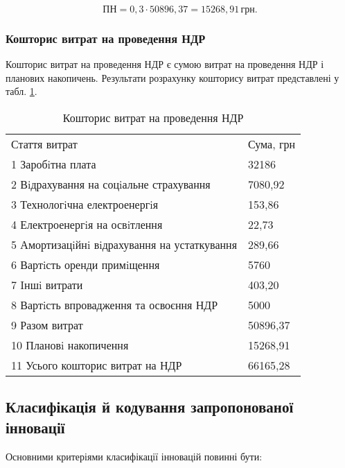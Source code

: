 \[
\text{ПН} = 0,3 \cdot 50896,37 = 15268,91 \, \text{грн}.
\]

\vspace{1.5em}

\subsubsection{Кошторис витрат на проведення НДР}

Кошторис витрат на проведення НДР є сумою витрат на проведення НДР і планових накопичень. Результати розрахунку кошторису витрат представлені у табл. \ref{tab:sumNDR}.



\begin{table}[hbt]
	\captionstyle{ \raggedright}
	\caption{Кошторис витрат на проведення НДР}\label{tab:sumNDR}
	\begin{tabular}{|p{}|p{}|}
		\hline
		Стаття витрат & Сума, грн \\
		\hlinewd{2pt}
		1 Заробiтна плата & 32186  \\
		\hline
		2 Вiдрахування на соцiальне страхування & 7080,92 \\
		\hline
		3 Технологiчна електроенергiя & 153,86 \\
		\hline
		4 Електроенергiя на освiтлення & 22,73 \\
		\hline
		5 Амортизацiйнi вiдрахування на устаткування & 289,66 \\
		\hline
		6 Вартiсть оренди примiщення & 5760 \\
		\hline
		7 Iншi витрати & 403,20 \\
		\hline
		8 Вартiсть впровадження та освоєння НДР & 5000 \\
		\hline
		9 Разом витрат & 50896,37 \\
		\hline
		10 Плановi накопичення & 15268,91 \\
		\hline
		11 Усього кошторис витрат на НДР & 66165,28  \\
		\hline
	\end{tabular}
\end{table}

\subsection{Класифікація й кодування запропонованої інновації}

Основними критеріями класифікації інновацій повинні бути:

